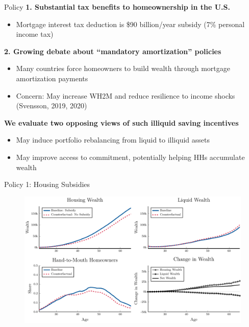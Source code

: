\documentclass[10pt,english,t,10pt]{beamer}
\begin{document}
\begin{frame}{Policy}
\textbf{1. Substantial tax benefits to homeownership in the U.S. }
\begin{itemize} 
\item Mortgage interest tax deduction is \$90 billion/year subsidy (7\% personal income tax)
\end{itemize}
\pause

\textbf{2. Growing debate about ``mandatory amortization'' policies}
\begin{itemize}
 
\item Many countries force homeowners to build wealth through mortgage amortization payments
 
\item Concern: May increase WH2M and reduce resilience to income shocks (Svensson, 2019, 2020)

\pause
\end{itemize}

\textbf{We evaluate two opposing views of such illiquid saving incentives}
\begin{itemize}
 
\item May induce portfolio rebalancing from liquid to illiquid assets
 
\item May improve access to commitment, potentially helping HHs accumulate wealth
\end{itemize}

\end{frame}

\begin{frame}{Policy 1: Housing Subsidies}
\begin{figure}[ht]
\centering
\includegraphics[scale=0.5]{Prezentation_Graphs/HousingSubisdy}
\end{figure}


\end{frame}
\end{document}
